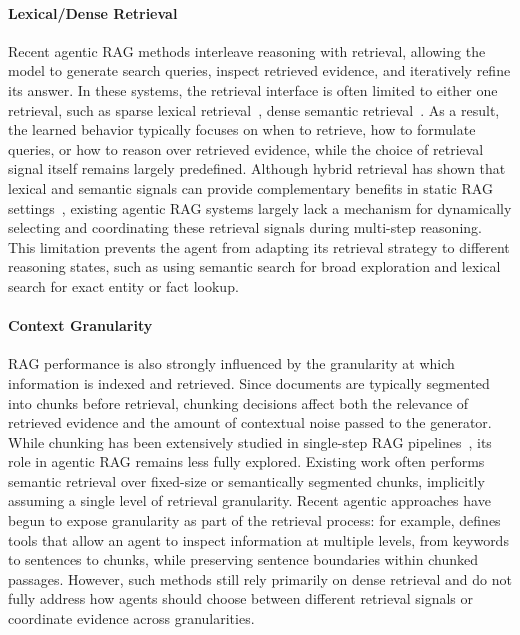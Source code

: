 \documentclass[11pt]{article}
\begin{document}
\paragraph{Lexical/Dense Retrieval}

Recent agentic RAG methods interleave reasoning with retrieval, allowing the model to generate search queries, inspect retrieved evidence, and iteratively refine its answer. In these systems, the retrieval interface is often limited to either one retrieval, such as sparse lexical retrieval~\cite{jiang2023active,trivedi2023interleaving,jeong2024adaptive}, dense semantic retrieval~\cite{li2025r3,jin2025search,leng2025decex}. As a result, the learned behavior typically focuses on when to retrieve, how to formulate queries, or how to reason over retrieved evidence, while the choice of retrieval signal itself remains largely predefined. Although hybrid retrieval has shown that lexical and semantic signals can provide complementary benefits in static RAG settings~\cite{glass2022re2g,ram2023context}, existing agentic RAG systems largely lack a mechanism for dynamically selecting and coordinating these retrieval signals during multi-step reasoning. This limitation prevents the agent from adapting its retrieval strategy to different reasoning states, such as using semantic search for broad exploration and lexical search for exact entity or fact lookup.

\paragraph{Context Granularity}

RAG performance is also strongly influenced by the granularity at which information is indexed and retrieved. Since documents are typically segmented into chunks before retrieval, chunking decisions affect both the relevance of retrieved evidence and the amount of contextual noise passed to the generator. While chunking has been extensively studied in single-step RAG pipelines~\cite{chen2024dense,wang2025document,zhao2025moc,qu2025semantic}, its role in agentic RAG remains less fully explored. Existing work often performs semantic retrieval over fixed-size or semantically segmented chunks, implicitly assuming a single level of retrieval granularity. Recent agentic approaches have begun to expose granularity as part of the retrieval process: for example, \citet{du2026rag} defines tools that allow an agent to inspect information at multiple levels, from keywords to sentences to chunks, while preserving sentence boundaries within chunked passages. However, such methods still rely primarily on dense retrieval and do not fully address how agents should choose between different retrieval signals or coordinate evidence across granularities. 
\end{document}
